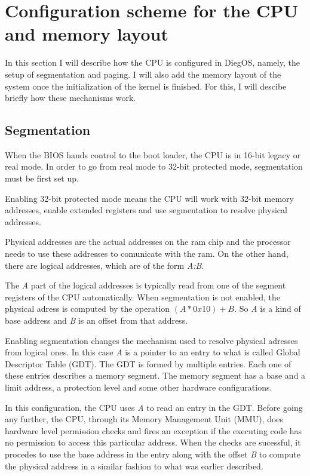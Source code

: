 \documentclass[12pt]{article}
\begin{document}
\section*{Configuration scheme for the CPU and memory layout}

In this section I will describe how the CPU is configured in DiegOS, namely, the setup of segmentation
and paging. I will also add the memory layout of the system once the initialization of the kernel is
finished. For this, I will descibe briefly how these mechanisms work.

\subsection*{Segmentation}

When the BIOS hands control to the boot loader, the CPU is in 16-bit legacy or real mode. In order to
go from real mode to 32-bit protected mode, segmentation must be first set up.

Enabling 32-bit protected mode means the CPU will work with 32-bit memory addresses, enable extended registers
and use segmentation to resolve physical addresses.

Physical addresses are the actual addresses on the ram chip and the processor needs to use these addresses to
comunicate with the ram. On the other hand, there are logical addresses, which are of the form \textit{A:B}.

The \textit{A} part of the logical addresses is typically read from one of the segment registers of the CPU
automatically. When segmentation is not enabled, the physical adress is computed by the operation $(A * 0x10) + B$.
So \textit{A} is a kind of base address and \textit{B} is an offset from that address.

Enabling segmentation changes the mechanism used to resolve physical adresses from logical ones. In this case
\textit{A} is a pointer to an entry to what is called Global Descriptor Table (GDT). The GDT is formed by multiple
entries. Each one of these entries describes a memory segment. The memory segment has a base and a limit address, 
a protection level and some other hardware configurations.

In this configuration, the CPU uses \textit{A} to read an entry in the GDT. Before going any further, the 
CPU, through its Memory Management Unit (MMU), does hardware level permission checks and fires an exception if
the executing code has no permission to access this particular address. When the checks are sucessful, it 
procedes to use the base address in the entry along with the offset \textit{B} to compute the physical address
in a similar fashion to what was earlier described.
\end{document}
